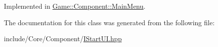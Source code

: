 Implemented in \mbox{\hyperlink{class_game_1_1_component_1_1_main_menu_ae50614def462ca82eb6c4404ee82a82e}{Game\+::\+Component\+::\+Main\+Menu}}.



The documentation for this class was generated from the following file\+:\begin{DoxyCompactItemize}
\item 
include/\+Core/\+Component/\mbox{\hyperlink{_i_start_u_i_8hpp}{I\+Start\+U\+I.\+hpp}}\end{DoxyCompactItemize}
